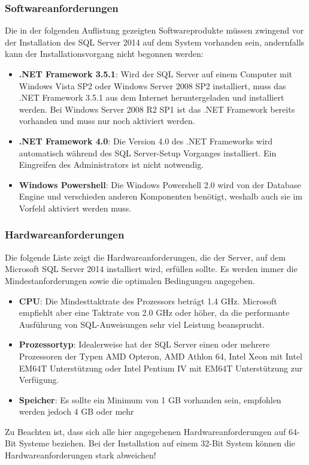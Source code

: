         \subsubsection{Softwareanforderungen}
          Die in der folgenden Auflistung gezeigten Softwareprodukte müssen
          zwingend vor der Installation des SQL Server 2014 auf dem System
          vorhanden sein, andernfalls kann der Installationsvorgang nicht begonnen
          werden:
          \begin{itemize}
              \item \textbf{.NET Framework 3.5.1}: Wird der SQL Server auf einem
              Computer mit Windows Vista SP2 oder Windows Server 2008 SP2
              installiert, muss das .NET Framework 3.5.1 aus dem Internet
              heruntergeladen und installiert werden. Bei Windows Server 2008 R2
              SP1 ist das .NET Framework bereits vorhanden und muss nur noch aktiviert
              werden.
              \item \textbf{.NET Framework 4.0}: Die Version 4.0 des .NET
              Frameworks wird automatisch während des SQL Server-Setup Vorganges
              installiert. Ein Eingreifen des Administrators ist nicht notwendig.
              \item \textbf{Windows Powershell}: Die Windows Powershell 2.0 wird
              von der Database Engine und verschieden anderen Komponenten
              benötigt, weshalb auch sie im Vorfeld aktiviert werden muss.
          \end{itemize}
        \subsubsection{Hardwareanforderungen}
          Die folgende Liste zeigt die Hardwareanforderungen, die der Server, auf
          dem Microsoft SQL Server 2014 installiert wird, erfüllen sollte. Es
          werden immer die Mindestanforderungen sowie die optimalen Bedingungen
          angegeben.
          \begin{itemize}
              \item \textbf{CPU}: Die Mindesttaktrate des Prozessors beträgt 1.4
              GHz. Microsoft empfiehlt aber eine Taktrate von 2.0 GHz oder höher,
              da die performante Ausführung von SQL-Anweisungen sehr viel Leistung
              beansprucht.
              \item \textbf{Prozessortyp}: Idealerweise hat der SQL Server
              einen oder mehrere Prozessoren der Typen AMD Opteron, AMD Athlon 64,
              Intel Xeon mit Intel EM64T Unterstützung oder Intel Pentium IV mit
              EM64T Unterstützung zur Verfügung.
              \item \textbf{Speicher}: Es sollte ein Minimum von 1 GB vorhanden
              sein, empfohlen werden jedoch 4 GB oder mehr
          \end{itemize}
          \begin{merke}
            Zu Beachten ist, dass sich alle hier angegebenen Hardwareanforderungen
            auf 64-Bit Systeme beziehen. Bei der Installation auf einem 32-Bit
            System können die Hardwareanforderungen stark abweichen!
          \end{merke}
